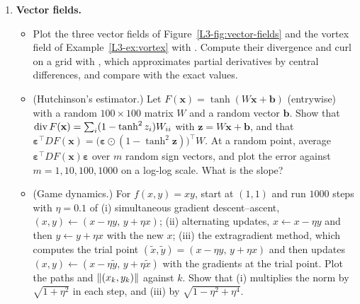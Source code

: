 \begin{enumerate}[label=\textbf{P\arabic*.}, leftmargin=*]
    \item \textbf{Vector fields.}
    \begin{itemize}
        \item Plot the three vector fields of Figure~\ref{L3-fig:vector-fields} and the vortex field of Example~\ref{L3-ex:vortex} with . Compute their divergence and curl on a grid with , which approximates partial derivatives by central differences, and compare with the exact values.
        \item (Hutchinson's estimator.) Let $F(\mathbf{x}) = \tanh(W\mathbf{x} + \mathbf{b})$ (entrywise) with a random $100 \times 100$ matrix $W$ and a random vector $\mathbf{b}$. Show that $\operatorname{div} F(\mathbf{x}) = \sum_i (1 - \tanh^2 z_i)W_{ii}$ with $\mathbf{z} = W\mathbf{x} + \mathbf{b}$, and that $\boldsymbol{\varepsilon}^\top DF(\mathbf{x}) = \big(\boldsymbol{\varepsilon} \odot (1 - \tanh^2\mathbf{z})\big)^\top W$. At a random point, average $\boldsymbol{\varepsilon}^\top DF(\mathbf{x})\boldsymbol{\varepsilon}$ over $m$ random sign vectors, and plot the error against $m = 1, 10, 100, 1000$ on a log-log scale. What is the slope?
        \item (Game dynamics.) For $f(x, y) = xy$, start at $(1, 1)$ and run $1000$ steps with $\eta = 0.1$ of (i) simultaneous gradient descent--ascent, $(x, y) \leftarrow (x - \eta y, \, y + \eta x)$; (ii) alternating updates, $x \leftarrow x - \eta y$ and then $y \leftarrow y + \eta x$ with the new $x$; (iii) the extragradient method, which computes the trial point $(\tilde x, \tilde y) = (x - \eta y, \, y + \eta x)$ and then updates $(x, y) \leftarrow (x - \eta\tilde y, \, y + \eta\tilde x)$ with the gradients at the trial point. Plot the paths and $\lVert (x_k, y_k) \rVert$ against $k$. Show that (i) multiplies the norm by $\sqrt{1 + \eta^2}$ in each step, and (iii) by $\sqrt{1 - \eta^2 + \eta^4}$.
    \end{itemize}


\end{enumerate}
